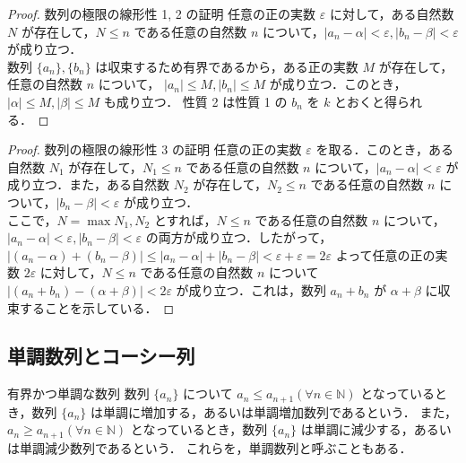 \documentclass[xelatex,ja=standard,jafont=noto]{bxjsarticle}
\begin{document}
  \begin{proof}{数列の極限の線形性 1, 2 の証明}{}
   任意の正の実数 $\varepsilon$ に対して，ある自然数 $N$ が存在して，$N \leq n$ である任意の自然数 $n$ について，$|a_n - \alpha| < \varepsilon, |b_n - \beta| < \varepsilon$ が成り立つ．
   \\
   数列 $\{a_n\}, \{b_n\}$ は収束するため有界であるから，ある正の実数 $M$ が存在して，任意の自然数 $n$ について， $|a_n| \leq M, |b_n| \leq M$ が成り立つ．このとき，$|\alpha| \leq M, |\beta| \leq M$ も成り立つ．
   性質 2 は性質 1 の $b_n$ を $k$ とおくと得られる．
  \end{proof}

  \begin{proof}{数列の極限の線形性 3 の証明}{}
    任意の正の実数 $\varepsilon$ を取る．このとき，ある自然数 $N_1$ が存在して，$N_1 \leq n$ である任意の自然数 $n$ について，$|a_n - \alpha| < \varepsilon$ が成り立つ．また，ある自然数 $N_2$ が存在して，$N_2 \leq n$ である任意の自然数 $n$ について，$|b_n - \beta| < \varepsilon$ が成り立つ．
    \\
   ここで，$N = \max {N_1, N_2}$ とすれば，$N \leq n$ である任意の自然数 $n$ について，$|a_n - \alpha| < \varepsilon, |b_n - \beta| < \varepsilon$ の両方が成り立つ．したがって，$|(a_n - \alpha) + (b_n - \beta)| \leq |a_n - \alpha| + |b_n - \beta| < \varepsilon + \varepsilon = 2\varepsilon$ よって任意の正の実数 $2\varepsilon$ に対して，$N \leq n$ である任意の自然数 $n$ について $|(a_n + b_n) - (\alpha + \beta)| < 2\varepsilon$ が成り立つ．これは，数列 ${a_n + b_n}$ が $\alpha + \beta$ に収束することを示している．
  \end{proof}

  \subsection{単調数列とコーシー列}
  \begin{tcb}{有界かつ単調な数列}{}
   数列 $\{a_n\}$ について $a_n \leq a_{n+1} (\forall n \in \mathbb{N})$ となっているとき，数列 $\{a_n\}$ は単調に増加する，あるいは単調増加数列であるという．
   また，$a_n \geq a_{n+1} (\forall n \in \mathbb{N})$ となっているとき，数列 $\{a_n\}$ は単調に減少する，あるいは単調減少数列であるという．
   これらを，単調数列と呼ぶこともある．

  \end{tcb}
\end{document}
